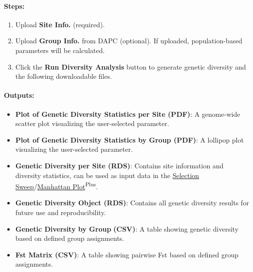 \documentclass[
]{book}
\begin{document}
\paragraph*{\texorpdfstring{\textbf{Steps:}}{Steps:}}\label{steps-5}

\begin{enumerate}
\def\labelenumi{\arabic{enumi}.}
\item
  {Upload} \textbf{Site Info.} (required).
\item
  {Upload} \textbf{Group Info.} from DAPC (optional). If uploaded, population-based parameters will be calculated.
\item
  Click the {\textbf{Run Diversity Analysis}} button to generate genetic diversity and the following downloadable files.
\end{enumerate}

\paragraph*{Outputs:}\label{outputs-12}

\begin{itemize}
\item
  \textbf{Plot of Genetic Diversity Statistics per Site (PDF)}: A genome-wide scatter plot visualizing the user-selected parameter.
\item
  \textbf{Plot of Genetic Diversity Statistics by Group (PDF)}: A lollipop plot visualizing the user-selected parameter.
\item
  \textbf{Genetic Diversity per Site (RDS)}: Contains site information and diversity statistics, can be used as input data in the \ul{Selection Sweep}/\ul{Manhattan Plot}\textsuperscript{Plus}.
\item
  \textbf{Genetic Diversity Object (RDS)}: Contains all genetic diversity results for future use and reproducibility.
\item
  \textbf{Genetic Diversity by Group} \textbf{(CSV)}: A table showing genetic diversity based on defined group assignments.
\item
  \textbf{Fst Matrix (CSV)}: A table showing pairwise Fst based on defined group assignments.
\end{itemize}
\end{document}
